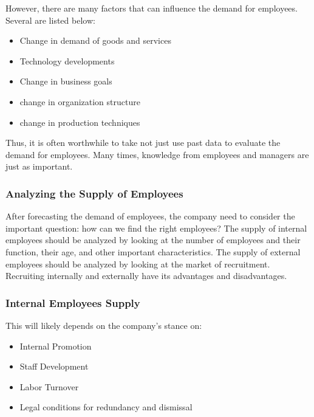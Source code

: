 \documentclass{standalone}
\begin{document}
However, there are many factors that can influence the demand for employees.
Several are listed below:
\begin{itemize}
	\item Change in demand of goods and services
	\item Technology developments
	\item Change in business goals
	\item change in organization structure
	\item change in production techniques
\end{itemize}
Thus, it is often worthwhile to take not just use past data to evaluate the demand for employees.
Many times, knowledge from employees and managers are just as important.

\subsubsection{Analyzing the Supply of Employees}
After forecasting the demand of employees, the company need to consider the important question: how can we find the right employees?
The supply of internal employees should be analyzed by looking at the number of employees and their function, their age, and other important characteristics.
The supply of external employees should be analyzed by looking at the market of recruitment.
Recruiting internally and externally have its advantages and disadvantages.

\begin{center}
\end{center}

\subsubsection{Internal Employees Supply}
This will likely depends on the company's stance on:
\begin{itemize}
	\item Internal Promotion
	\item Staff Development
	\item Labor Turnover
	\item Legal conditions for redundancy and dismissal
\end{itemize}
\end{document}
